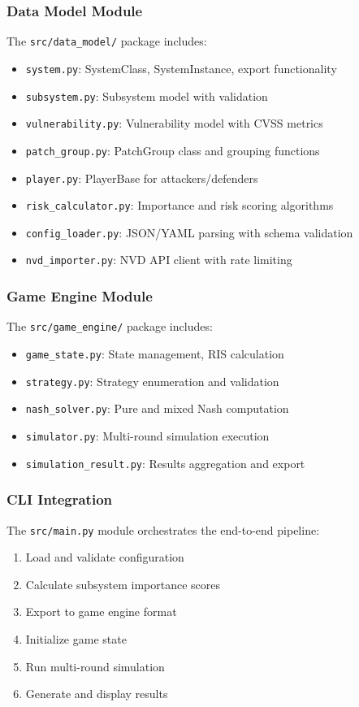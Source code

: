 \documentclass[conference]{IEEEtran}
\begin{document}
\subsubsection{Data Model Module}
The \texttt{src/data\_model/} package includes:
\begin{itemize}
    \item \texttt{system.py}: SystemClass, SystemInstance, export functionality
    \item \texttt{subsystem.py}: Subsystem model with validation
    \item \texttt{vulnerability.py}: Vulnerability model with CVSS metrics
    \item \texttt{patch\_group.py}: PatchGroup class and grouping functions
    \item \texttt{player.py}: PlayerBase for attackers/defenders
    \item \texttt{risk\_calculator.py}: Importance and risk scoring algorithms
    \item \texttt{config\_loader.py}: JSON/YAML parsing with schema validation
    \item \texttt{nvd\_importer.py}: NVD API client with rate limiting
\end{itemize}

\subsubsection{Game Engine Module}
The \texttt{src/game\_engine/} package includes:
\begin{itemize}
    \item \texttt{game\_state.py}: State management, RIS calculation
    \item \texttt{strategy.py}: Strategy enumeration and validation
    \item \texttt{nash\_solver.py}: Pure and mixed Nash computation
    \item \texttt{simulator.py}: Multi-round simulation execution
    \item \texttt{simulation\_result.py}: Results aggregation and export
\end{itemize}

\subsubsection{CLI Integration}
The \texttt{src/main.py} module orchestrates the end-to-end pipeline:
\begin{enumerate}
    \item Load and validate configuration
    \item Calculate subsystem importance scores
    \item Export to game engine format
    \item Initialize game state
    \item Run multi-round simulation
    \item Generate and display results
\end{enumerate}
\end{document}
